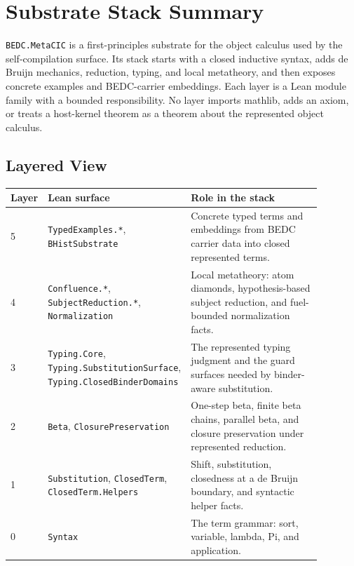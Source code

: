\section{Substrate Stack Summary}
\label{sec:self-comp-substrate-stack-summary}

\texttt{BEDC.MetaCIC} is a first-principles substrate for the object calculus
used by the self-compilation surface. Its stack starts with a closed inductive
syntax, adds de Bruijn mechanics, reduction, typing, and local metatheory, and
then exposes concrete examples and BEDC-carrier embeddings. Each layer is a
Lean module family with a bounded responsibility. No layer imports mathlib,
adds an axiom, or treats a host-kernel theorem as a theorem about the
represented object calculus.

\subsection{Layered View}
\label{subsec:substrate-stack-layered-view}

\begin{center}
\begin{tabular}{p{0.12\linewidth}p{0.30\linewidth}p{0.46\linewidth}}
\toprule
Layer & Lean surface & Role in the stack \\
\midrule
5 & \texttt{TypedExamples.*}, \texttt{BHistSubstrate} &
Concrete typed terms and embeddings from BEDC carrier data into closed
represented terms. \\
4 & \texttt{Confluence.*}, \texttt{SubjectReduction.*},
\texttt{Normalization} &
Local metatheory: atom diamonds, hypothesis-based subject reduction, and
fuel-bounded normalization facts. \\
3 & \texttt{Typing.Core}, \texttt{Typing.SubstitutionSurface},
\texttt{Typing.ClosedBinderDomains} &
The represented typing judgment and the guard surfaces needed by binder-aware
substitution. \\
2 & \texttt{Beta}, \texttt{ClosurePreservation} &
One-step beta, finite beta chains, parallel beta, and closure preservation
under represented reduction. \\
1 & \texttt{Substitution}, \texttt{ClosedTerm},
\texttt{ClosedTerm.Helpers} &
Shift, substitution, closedness at a de Bruijn boundary, and syntactic helper
facts. \\
0 & \texttt{Syntax} &
The term grammar: sort, variable, lambda, Pi, and application. \\
\bottomrule
\end{tabular}
\end{center}


